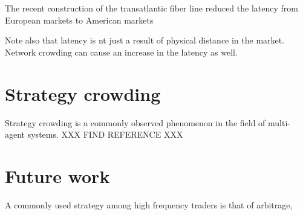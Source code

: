 The recent construction of the transatlantic fiber line reduced the latency from European markets to American markets 

Note also that latency is nt just a result of physical distance in the market. Network crowding can cause an increase in the latency as well. 


\section{Strategy crowding}
Strategy crowding is a commonly observed phenomenon in the field of multi-agent systems. XXX FIND REFERENCE XXX

\section{Future work}
A commonly used strategy among high frequency traders is that of arbitrage, 


